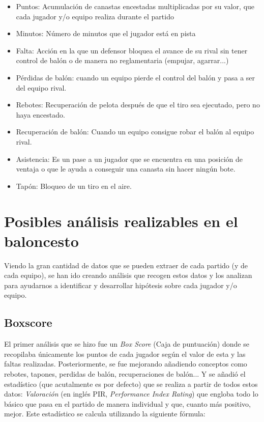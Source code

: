 \documentclass[paper=a4, fontsize=9pt]{article}
\begin{document}
\begin{itemize}

\item Puntos: Acumulación de canastas encestadas multiplicadas por su valor, que cada  jugador y/o equipo realiza durante el partido
\item Minutos: Número de minutos que el jugador está en pista
\item Falta: Acción en la que un defensor bloquea el avance de su rival sin tener control de balón o de manera no reglamentaria (empujar, agarrar...)
\item Pérdidas de balón: cuando un equipo pierde el control del balón y pasa a ser del equipo rival.
\item Rebotes: Recuperación de pelota después de que el tiro sea ejecutado, pero no haya encestado.
\item Recuperación de balón: Cuando un equipo consigue robar el balón al equipo rival.
\item Asistencia: Es un pase a un jugador que se encuentra en una posición de ventaja o que le ayuda a conseguir una canasta sin hacer ningún bote.
\item Tapón: Bloqueo de un tiro en el aire.

\end{itemize}

\section{Posibles análisis realizables en el baloncesto}

Viendo la gran cantidad de datos que se pueden extraer de cada partido (y de cada equipo), se han ido creando análisis que recogen estos datos y los analizan para ayudarnos a identificar y desarrollar hipótesis sobre cada jugador y/o equipo.

\subsection{Boxscore}

El primer análisis que se hizo fue un \emph{Box Score} (Caja de puntuación) donde se recopilaba únicamente los puntos de cada jugador según el valor de esta y las faltas realizadas. Posteriormente, se fue mejorando añadiendo conceptos como rebotes, tapones, perdidas de balón, recuperaciones de balón... Y se añadió el estadístico (que acutalmente es por defecto) que se realiza a partir de todos estos datos: \emph{Valoración} (en inglés PIR, \emph{Performance Index Rating}) que engloba todo lo básico que pasa en el partido de manera individual y que, cuanto más positivo, mejor. Este estadístico se calcula utilizando la siguiente fórmula:
  
\end{document}
